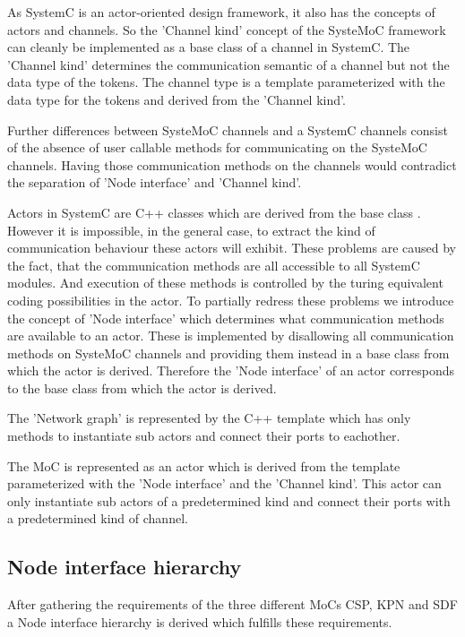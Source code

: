 As SystemC is an actor-oriented design framework, it also has the concepts of actors
and channels. So the 'Channel kind' concept of the SysteMoC framework can cleanly be implemented
as a base class of a channel in SystemC. The 'Channel kind' determines the
communication semantic of a channel but not the data type of the tokens.
The channel type is a template parameterized with the data type for the tokens and
derived from the 'Channel kind'.

Further differences between SysteMoC channels and a SystemC channels consist of the
absence of user callable methods for communicating on the SysteMoC channels.
Having those communication methods on the channels would contradict the separation
of 'Node interface' and 'Channel kind'.

Actors in SystemC are C++ classes which are derived from the base class .
However it is impossible, in the general case, to extract the kind of communication
behaviour these actors will exhibit. These problems are caused by the fact, that the
communication methods are all accessible to all SystemC modules. And execution
of these methods is controlled by the turing equivalent coding possibilities in the actor.
To partially redress these problems we introduce the concept of 'Node interface' which
determines what communication methods are available to an actor. These is implemented
by disallowing all communication methods on SysteMoC channels and providing them instead
in a base class from which the actor is derived. Therefore the 'Node interface' of an actor
corresponds to the base class from which the actor is derived.

The 'Network graph' is represented by the C++ template  
which has only methods to instantiate sub actors and connect their ports to eachother.

The MoC is represented as an actor which is derived from the 
template parameterized with the 'Node interface' and the 'Channel kind'. This actor can only
instantiate sub actors of a predetermined kind and connect their ports with a  predetermined
kind of channel.

\subsection{Node interface hierarchy}
After gathering the requirements of the three different MoCs CSP, KPN
and SDF a Node interface hierarchy is derived which fulfills these requirements.

